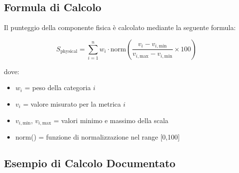 \subsection{Formula di Calcolo}

Il punteggio della componente fisica è calcolato mediante la seguente formula:

\begin{equation}
S_{\text{physical}} = \sum_{i=1}^{n} w_i \cdot \text{norm}\left(\frac{v_i - v_{i,\text{min}}}{v_{i,\text{max}} - v_{i,\text{min}}} \times 100\right)
\label{eq:physical-score}
\end{equation}

dove:
\begin{itemize}
    \item $w_i$ = peso della categoria $i$ 
    \item $v_i$ = valore misurato per la metrica $i$
    \item $v_{i,\text{min}}$, $v_{i,\text{max}}$ = valori minimo e massimo della scala
    \item norm() = funzione di normalizzazione nel range [0,100]
\end{itemize}

\subsection{Esempio di Calcolo Documentato}

